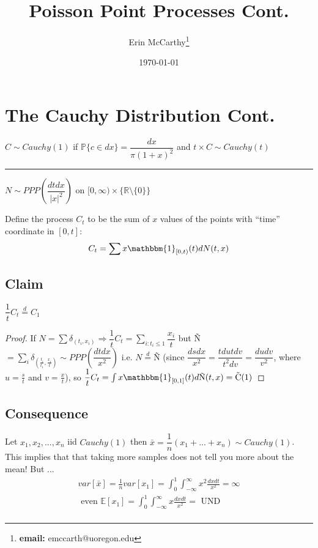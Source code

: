 \documentclass[12pt]{article}
\title{Poisson Point Processes Cont.}
\author{Erin McCarthy\thanks{\textbf{email:} emccarth@uoregon.edu}}
\date{\today}
\begin{document}
    \maketitle
    
    \section{The Cauchy Distribution Cont.}
    
    $C \sim Cauchy(1)$ 
    if $\mathbb{P}\{c \in dx\}= \dfrac{dx}{\pi(1+x)^2}$ and $t \times C \sim Cauchy(t)$
    
    \noindent\rule{4cm}{0.4pt} 
    
    \noindent$N \sim PPP(\dfrac{dtdx}{|x|^2})$ on $[0,\infty) \times \{ \mathbb{R}\setminus \{0\}\}$
    
    \noindent Define the process $C_t$ to be the sum of $x$ values of the points with ``time'' coordinate in $[0,t]$:
    $$C_t = \sum x \mathbbm{1}_{[0,t)}(t) dN(t,x)$$

    \subsection*{Claim}
    $\dfrac{1}{t} C_t \stackrel{d}{=} C_1$
    
    \begin{proof}
    If $N = \sum \delta_{(t_i,x_i)} \Rightarrow \dfrac{1}{t} C_t = \sum_{i:t_i\leq1} \dfrac{x_i}{t}$ but \~N $= \sum_i \delta_{\left(\frac{t_i}{t_1}, \frac{x_i}{t}\right)} \sim PPP(\dfrac{dtdx}{x^2})$ i.e. $N \stackrel{d}{=} $\~N
    (since $\dfrac{dsdx}{x^2} = \dfrac{tdu tdv}{t^2dv}=\dfrac{dudv}{v^2}$, where $u=\frac{s}{t}$ and $v=\frac{x}{t}$), so $\dfrac{1}{t}C_t = \int x \mathbbm{1}_{[0,1]}(t) d\text{\~{N}} (t,x) = \text{\~C}(1)$ 
    \end{proof}
    
    
    \subsection*{Consequence}
    Let $x_1,x_2,...,x_n$ iid $Cauchy(1)$ then $\bar{x} = \dfrac{1}{n} (x_1+...+x_n) \sim Cauchy(1)$. This implies that that taking more samples does not tell you more about the mean! But ...\\
    $$\begin{aligned}
    var[\bar{x}] = \frac{1}{n}var[x_1] = \int_0^1 \int_{-\infty}^{\infty} x^2 \frac{dxdt}{x^2} = \infty \\ \text{ even } \mathbb{E}[x_1]=\int_0^1\int_{-\infty}^\infty x \frac{dxdt}{x^2} = \text{ UND }\\
    \end{aligned}$$
    
\end{document}
